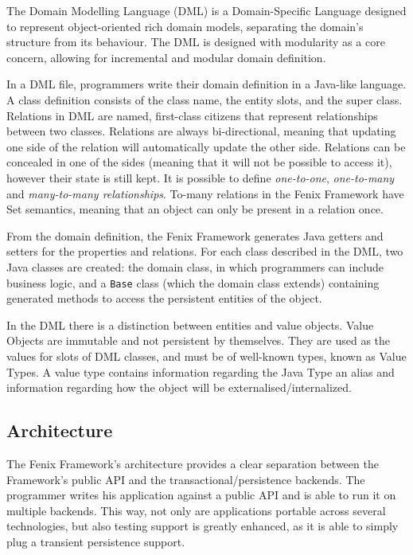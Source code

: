 \documentclass{llncs}
\begin{document}
The Domain Modelling Language (DML) is a Domain-Specific Language
designed to represent object-oriented rich domain models, separating
the domain's structure from its behaviour. The DML is designed with
modularity as a core concern, allowing for incremental and modular
domain definition.

In a DML file, programmers write their domain definition in a
Java-like language. A class definition consists of the class name, the
entity slots, and the super class. Relations in DML are named,
first-class citizens that represent relationships between two
classes. Relations are always bi-directional, meaning that updating
one side of the relation will automatically update the other
side. Relations can be concealed in one of the sides (meaning that it
will not be possible to access it), however their state is still kept.
It is possible to define {\it one-to-one}, {\it one-to-many} and {\it
  many-to-many relationships}. To-many relations in the Fenix
Framework have Set semantics, meaning that an object can only be
present in a relation once.

From the domain definition, the Fenix Framework generates Java getters
and setters for the properties and relations. For each class described
in the DML, two Java classes are created: the domain class, in which
programmers can include business logic, and a \texttt{Base} class
(which the domain class extends) containing generated methods to
access the persistent entities of the object.

In the DML there is a distinction between entities and value
objects. Value Objects are immutable and not persistent by
themselves. They are used as the values for slots of DML classes, and
must be of well-known types, known as Value Types. A value type
contains information regarding the Java Type an alias and information
regarding how the object will be externalised/internalized.

\subsection{Architecture}
\label{sec:ff-arch}

The Fenix Framework's architecture provides a clear separation between
the Framework's public API and the transactional/persistence
backends. The programmer writes his application against a public API
and is able to run it on multiple backends. This way, not only are
applications portable across several technologies, but also testing
support is greatly enhanced, as it is able to simply plug a transient
persistence support.
\end{document}
